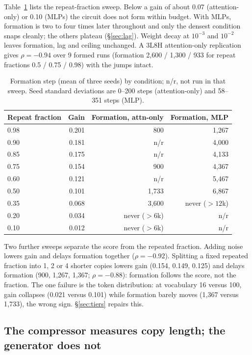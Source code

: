 \documentclass[11pt]{article}
\begin{document}
Table~\ref{tab:gain} lists the repeat-fraction sweep. Below a gain of about
0.07 (attention-only) or 0.10 (MLPs) the circuit does not form within
budget. With MLPs, formation is two to four times later throughout and only
the densest condition snaps cleanly; the others plateau
(\S\ref{sec:lag}). Weight decay at $10^{-3}$ and $10^{-2}$ leaves
formation, lag and ceiling unchanged. A 3L8H attention-only replication
gives $\rho=-0.94$ over 9 formed runs (formation 2,600 / 1,300 / 933 for
repeat fractions 0.5 / 0.75 / 0.98) with the jumps intact.

\begin{table}[t]\centering\small
\begin{tabular}{lrrr}\toprule
Repeat fraction & Gain & Formation, attn-only & Formation, MLP \\\midrule
0.98 & 0.201 & 800   & 1,267 \\
0.90 & 0.181 & n/r   & 4,000 \\
0.85 & 0.175 & n/r   & 4,133 \\
0.75 & 0.154 & 900   & 4,367 \\
0.60 & 0.121 & n/r   & 5,467 \\
0.50 & 0.101 & 1,733 & 6,867 \\
0.35 & 0.068 & 3,600 & never ($>12$k) \\
0.20 & 0.034 & never ($>6$k) & n/r \\
0.10 & 0.012 & never ($>6$k) & n/r \\\bottomrule
\end{tabular}
\caption{Formation step (mean of three seeds) by condition; n/r, not run
in that sweep. Seed standard deviations are 0--200 steps (attention-only)
and 58--351 steps (MLP).}
\label{tab:gain}
\end{table}

Two further sweeps separate the score from the repeated fraction. Adding
noise lowers gain and delays formation together ($\rho=-0.92$). Splitting
a fixed repeated fraction into 1, 2 or 4 shorter copies lowers gain
(0.154, 0.149, 0.125) and delays formation (900, 1,267, 1,367;
$\rho=-0.88$): formation follows the score, not the fraction. The one
failure is the token distribution: at vocabulary 16 versus 100, gain
collapses (0.021 versus 0.101) while formation barely moves (1,367 versus
1,733), the wrong sign. \S\ref{sec:tiers} repairs this.

\subsection{The compressor measures copy length; the generator does not}
\label{sec:oracle}
\end{document}
